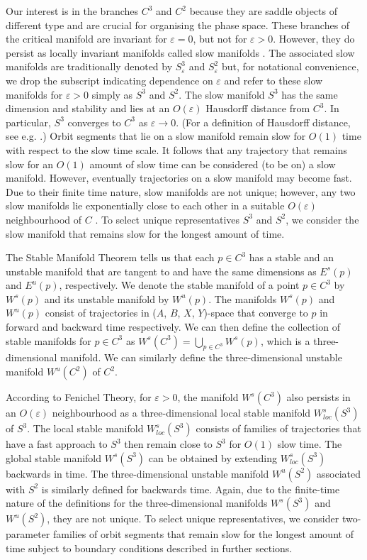 \documentclass{ws-ijbc}
\begin{document}
Our interest is in the branches $C^3$ and $C^2$ because they are saddle objects of different type and are crucial for organising the phase space.  These branches of the critical manifold are invariant for $\varepsilon = 0$, but not for $\varepsilon > 0$.  However, they do persist as locally invariant manifolds called slow manifolds \cite{Fenichel}.  The associated slow manifolds are traditionally denoted by $S^3_\varepsilon$ and $S^2_\varepsilon$ but, for notational convenience, we drop the subscript indicating dependence on $\varepsilon$ and refer to these slow manifolds for $\varepsilon > 0$ simply as $S^3$ and $S^2$.  The slow manifold $S^3$ has the same dimension and stability and lies at an $O(\varepsilon)$ Hausdorff distance from $C^3$.  In particular, $S^3$ converges to $C^3$ as $\varepsilon \rightarrow 0$.  (For a definition of Hausdorff distance, see e.g. \cite{Hausdorff_Distance}.)  Orbit segments that lie on a slow manifold remain slow for $O(1)$ time with respect to the slow time scale.  It follows that any trajectory that remains slow for an $O(1)$ amount of slow time can be considered (to be on) a slow manifold.  However, eventually trajectories on a slow manifold may become fast. Due to their finite time nature, slow manifolds are not unique; however, any two slow manifolds lie exponentially close to each other in a suitable $O(\varepsilon)$ neighbourhood of $C$ \cite{Fenichel}.  To select unique representatives $S^3$ and $S^2$, we consider the slow manifold that remains slow for the longest amount of time.

The Stable Manifold Theorem tells us that each $p \in C^3$ has a stable and an unstable manifold that are tangent to and have the same dimensions as $E^{s}(p)$ and $E^{u}(p)$, respectively.  We denote the stable manifold of a point $p \in C^3$ by $W^{s}(p)$ and its unstable manifold by $W^{u}(p)$.  The manifolds $W^{s}(p)$ and $W^{u}(p)$ consist of trajectories in ($A$, $B$, $X$, $Y$)-space that converge to $p$ in forward and backward time respectively.  We can then define the collection of stable manifolds for $p \in C^3$ as $W^{s}(C^3) = \bigcup_{p \in C^3} W^{s}(p)$, which is a three-dimensional manifold.  We can similarly define the three-dimensional unstable manifold $W^{u}(C^2)$ of $C^2$.

According to Fenichel Theory, for $\varepsilon > 0$, the manifold $W^{s}(C^3)$ also persists in an $O(\varepsilon)$ neighbourhood as a three-dimensional local stable manifold $W^{s}_{loc}(S^3)$ of $S^3$.  The local stable manifold $W^{s}_{loc}(S^3)$ consists of families of trajectories that have a fast approach to $S^3$ then remain close to $S^3$ for $O(1)$ slow time.  The global stable manifold $W^{s}(S^3)$ can be obtained by extending $W^{s}_{loc}(S^3)$ backwards in time.  The three-dimensional unstable manifold $W^{u}(S^2)$ associated with $S^2$ is similarly defined for backwards time.  Again, due to the finite-time nature of the definitions for the three-dimensional manifolds $W^{s}(S^3)$ and $W^{u}(S^2)$, they are not unique.  To select unique representatives, we consider two-parameter families of orbit segments that remain slow for the longest amount of time subject to boundary conditions described in further sections.  
 
\end{document}
